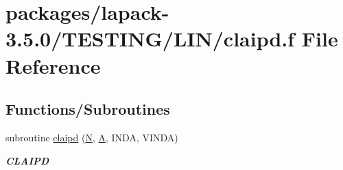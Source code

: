 \hypertarget{claipd_8f}{}\section{packages/lapack-\/3.5.0/\+T\+E\+S\+T\+I\+N\+G/\+L\+I\+N/claipd.f File Reference}
\label{claipd_8f}
\subsection*{Functions/\+Subroutines}
\begin{DoxyCompactItemize}
\item 
subroutine \hyperlink{group__complex__lin_gaba2e103437a13477a0b9a97ac835c138}{claipd} (\hyperlink{polmisc_8c_a0240ac851181b84ac374872dc5434ee4}{N}, \hyperlink{classA}{A}, I\+N\+D\+A, V\+I\+N\+D\+A)
\begin{DoxyCompactList}\small\item\em {\bfseries C\+L\+A\+I\+P\+D} \end{DoxyCompactList}\end{DoxyCompactItemize}
